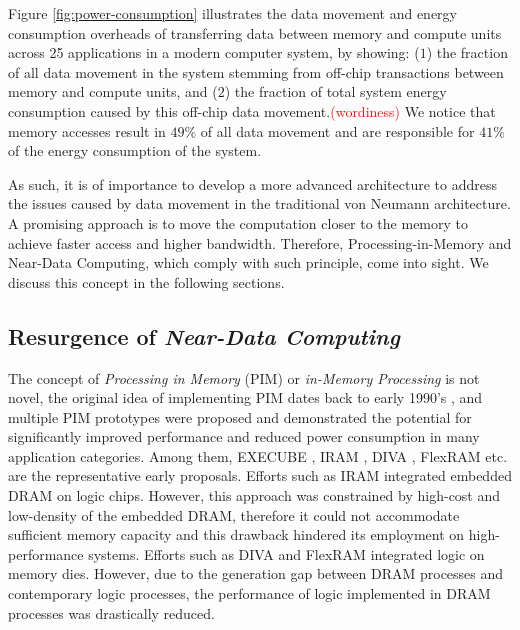 \documentclass[letterpaper, 11pt, conference, margin=1in]{ieeeconf}   %
\newcommand\myworries[1]{\textcolor{red}{(#1)}}
\begin{document}
Figure \ref{fig:power-consumption} illustrates the data movement and energy consumption overheads of transferring data between memory and compute units across 25 applications in a modern computer system, by showing: ($1$) the fraction of all data movement in the system stemming from off-chip transactions between memory and compute units, and ($2$) the fraction of total system energy consumption caused by this off-chip data movement.\myworries{wordiness} We notice that memory accesses result in $49\%$ of all data movement and are responsible for $41\%$ of the energy consumption of the system.

As such, it is of importance to develop a more advanced architecture to address the issues caused by data movement in the traditional von Neumann architecture. A promising approach is to move the computation closer to the memory to achieve faster access and higher bandwidth. Therefore, Processing-in-Memory and Near-Data Computing, which comply with such principle, come into sight. We discuss this concept in the following sections.

\subsection{\bf Resurgence of \textit{Near-Data Computing}}
The concept of \textit{Processing in Memory} (PIM) or \textit{in-Memory Processing} is not novel, the original idea of implementing PIM dates back to early 1990's \cite{Kogge:1994:ENA:1260980.1261010, Gokhale:1995:PMT:618996.620191, Hall:1999:MIA:331532.331589, Patterson:1997:CIR:623274.624083, 808425, 748803}, and multiple PIM prototypes were proposed and demonstrated the potential for significantly improved performance and reduced power consumption in many application categories. Among them, EXECUBE \cite{Kogge:1994:ENA:1260980.1261010}, IRAM \cite{Patterson:1997:CIR:623274.624083}, DIVA \cite{Hall:1999:MIA:331532.331589}, FlexRAM \cite{808425} etc. are the representative early proposals. Efforts such as IRAM \cite{Patterson:1997:CIR:623274.624083} integrated embedded DRAM on logic chips. However, this approach was constrained by high-cost and low-density of the embedded DRAM, therefore it could not accommodate sufficient memory capacity and this drawback hindered its employment on high-performance systems.  Efforts such as DIVA \cite{Hall:1999:MIA:331532.331589} and FlexRAM \cite{808425} integrated logic on memory dies. However, due to the generation gap between DRAM processes and contemporary logic processes, the performance of logic implemented in DRAM processes was drastically reduced.
\end{document}
